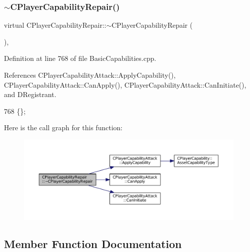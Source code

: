\subsubsection{\texorpdfstring{$\sim$\+C\+Player\+Capability\+Repair()}{~CPlayerCapabilityRepair()}}
{\footnotesize\ttfamily virtual C\+Player\+Capability\+Repair\+::$\sim$\+C\+Player\+Capability\+Repair (\begin{DoxyParamCaption}{ }\end{DoxyParamCaption})\hspace{0.3cm}{\ttfamily [inline]}, {\ttfamily [virtual]}}



Definition at line 768 of file Basic\+Capabilities.\+cpp.



References C\+Player\+Capability\+Attack\+::\+Apply\+Capability(), C\+Player\+Capability\+Attack\+::\+Can\+Apply(), C\+Player\+Capability\+Attack\+::\+Can\+Initiate(), and D\+Registrant.


\begin{DoxyCode}
768 \{\};
\end{DoxyCode}
Here is the call graph for this function\+:\nopagebreak
\begin{figure}[H]
\begin{center}
\leavevmode
\includegraphics[width=350pt]{classCPlayerCapabilityRepair_ad8ed0fc101b58a3b4eeb42fa3cab0511_cgraph}
\end{center}
\end{figure}


\subsection{Member Function Documentation}
\hypertarget{classCPlayerCapabilityRepair_ab4e8da6f225b4bfb7023d75749454ff1}{}\label{classCPlayerCapabilityRepair_ab4e8da6f225b4bfb7023d75749454ff1} 
